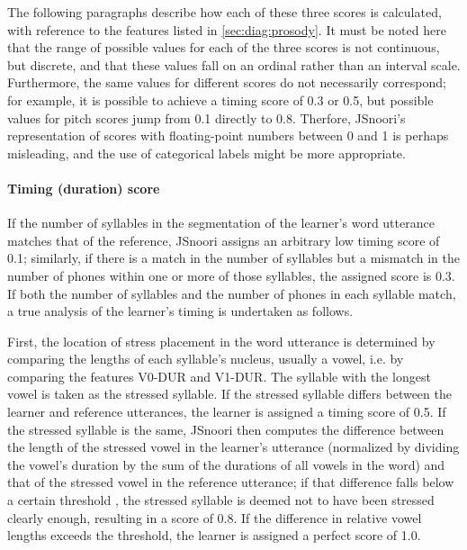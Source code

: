	
	The following paragraphs describe how each of these three scores is calculated, with reference to the features listed in \cref{sec:diag:prosody}. It must be noted here that the range of possible values for each of the three scores is not continuous, but discrete, and that these values fall on an ordinal rather than an interval scale. Furthermore, the same values for different scores do not necessarily correspond; for example, it is possible to achieve a timing score of 0.3 or 0.5, but possible values for pitch scores jump from 0.1 directly to 0.8.
	Therfore, JSnoori's representation of scores with floating-point numbers between 0 and 1 is perhaps misleading, and the use of categorical labels might be more appropriate.
	
	
	
	\paragraph{Timing (duration) score}
	
	If the number of syllables in the segmentation of the learner's word utterance matches that of the reference, JSnoori assigns an arbitrary low timing score of 0.1; similarly, if there is a match in the number of syllables but a mismatch in the number of phones within one or more of those syllables, the assigned score is 0.3. 
	If both the number of syllables and the number of phones in each syllable match, a true analysis of the learner's timing is undertaken as follows.
	
	First, the location of stress placement in the word utterance is determined by comparing the lengths of each syllable's nucleus, usually a vowel, i.e. by comparing the features V0-DUR and V1-DUR. The syllable with the longest vowel is taken as the stressed syllable. If the stressed syllable differs between the learner and reference utterances, the learner is assigned a timing score of 0.5. If the stressed syllable is the same, JSnoori then computes the difference between the length of the stressed vowel in the learner's utterance (normalized by dividing the vowel's duration by the sum of the durations of all vowels in the word) and that of the stressed vowel in the reference utterance; if that difference falls below a certain threshold , the stressed syllable is deemed not to have been stressed clearly enough, resulting in a score of 0.8. If the difference in relative vowel lengths exceeds the threshold, the learner is assigned a perfect score of 1.0.
	
